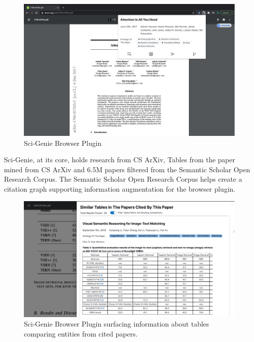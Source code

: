 \begin{figure}[h]
    \centering
    \includegraphics[width=\maxwidth{\textwidth}]{src/images/sci-genie-ext-exp.png}
    \caption{ Sci-Genie Browser Plugin}
    \label{figure\arabic{figurecounter}}
\end{figure}

Sci-Genie, at its core, holds research from CS ArXiv, Tables from the paper mined from CS ArXiv and 6.5M papers filtered from the Semantic Scholar Open Research Corpus\parencite{ammar-etal-2018-construction}. The Semantic Scholar Open Research Corpus helps create a citation graph supporting information augmentation for the browser plugin. 

\begin{figure}[h]
    \centering
    \includegraphics[width=\maxwidth{\textwidth}]{src/images/sci-genie-ext-table-comp-exp.pdf}
    \caption{Sci-Genie Browser Plugin surfacing information about tables comparing entities from cited papers.}
    \label{figure\arabic{figurecounter}}
\end{figure}


